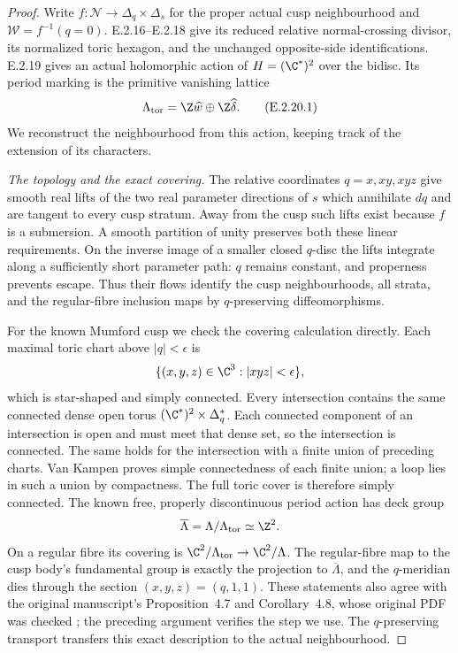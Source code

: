\begin{proof}
Write $f:\mathcal N\to\Delta_q\times\Delta_s$
for the proper actual cusp neighbourhood and
$\mathcal W=f^{-1}(q=0)$.  E.2.16--E.2.18
give its reduced relative normal-crossing
divisor, its normalized toric hexagon, and
the unchanged opposite-side identifications.
E.2.19 gives an actual holomorphic action
of $H=(\C^*)^2$ over the bidisc.  Its
period marking is the primitive vanishing
lattice
\[
 \Lambda_{\rm tor}
   =\Z\widehat w\oplus\Z\widehat\delta.
 \tag{E.2.20.1}
\]
We reconstruct the neighbourhood from
this action, keeping track of the
extension of its characters.

\emph{The topology and the exact covering.}
The relative coordinates
$q=x,xy,xyz$ give smooth real lifts
of the two real parameter directions
of $s$ which annihilate $dq$ and
are tangent to every cusp stratum.
Away from the cusp such lifts exist
because $f$ is a submersion.
A smooth partition of unity preserves
both these linear requirements.
On the inverse image of a smaller
closed $q$-disc the lifts integrate
along a sufficiently short parameter
path: $q$ remains constant, and
properness prevents escape.
Thus their flows identify the cusp
neighbourhoods, all strata, and
the regular-fibre inclusion maps
by $q$-preserving diffeomorphisms.

For the known Mumford cusp we
check the covering calculation
directly.  Each maximal toric
chart above $|q|<\epsilon$ is
\[
 \{(x,y,z)\in\C^3:|xyz|<\epsilon\},
\]
which is star-shaped and simply
connected.  Every intersection
contains the same connected dense
open torus $(\C^*)^2\times\Delta_q^*$.
Each connected component of an
intersection is open and must meet
that dense set, so the intersection
is connected.  The same holds for
the intersection with a finite
union of preceding charts.
Van Kampen proves simple
connectedness of each finite
union; a loop lies in such a
union by compactness.  The full
toric cover is therefore simply
connected.  The known free,
properly discontinuous period
action has deck group
\[
 \overline\Lambda=\Lambda/\Lambda_{\rm tor}
                 \simeq\Z^2.
\]
On a regular fibre its covering
is $\C^2/\Lambda_{\rm tor}\to
\C^2/\Lambda$.  The regular-fibre
map to the cusp body's fundamental
group is exactly the projection
to $\overline\Lambda$, and the
$q$-meridian dies through the
section $(x,y,z)=(q,1,1)$.
These statements also agree
with the original manuscript's
Proposition~4.7 and Corollary~4.8,
whose original PDF was checked
\cite[p.~30]{AC26Root}; the
preceding argument verifies
the step we use.  The
$q$-preserving transport transfers
this exact description to the
actual neighbourhood.


\end{proof}

